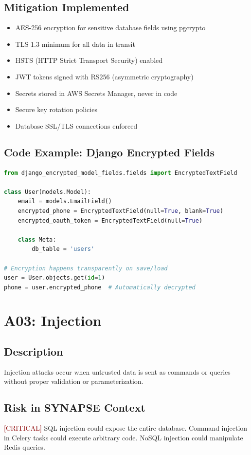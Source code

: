 \documentclass{report}
\begin{document}
\subsection{Mitigation Implemented}
\begin{itemize}
\item AES-256 encryption for sensitive database fields using pgcrypto
\item TLS 1.3 minimum for all data in transit
\item HSTS (HTTP Strict Transport Security) enabled
\item JWT tokens signed with RS256 (asymmetric cryptography)
\item Secrets stored in AWS Secrets Manager, never in code
\item Secure key rotation policies
\item Database SSL/TLS connections enforced
\end{itemize}

\subsection{Code Example: Django Encrypted Fields}
\begin{lstlisting}[language=Python]
from django_encrypted_model_fields.fields import EncryptedTextField

class User(models.Model):
    email = models.EmailField()
    encrypted_phone = EncryptedTextField(null=True, blank=True)
    encrypted_oauth_token = EncryptedTextField(null=True)
    
    class Meta:
        db_table = 'users'

# Encryption happens transparently on save/load
user = User.objects.get(id=1)
phone = user.encrypted_phone  # Automatically decrypted
\end{lstlisting}

\section{A03: Injection}

\subsection{Description}
Injection attacks occur when untrusted data is sent as commands or queries without proper validation or parameterization.

\subsection{Risk in SYNAPSE Context}
\textcolor{darkred}{[CRITICAL]} SQL injection could expose the entire database. Command injection in Celery tasks could execute arbitrary code. NoSQL injection could manipulate Redis queries.
\end{document}
